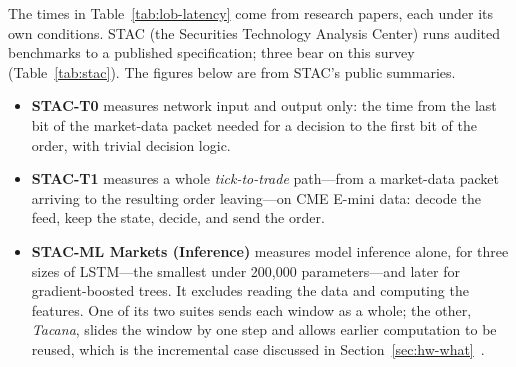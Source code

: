 The times in Table~\ref{tab:lob-latency} come from research papers, each under its own conditions. STAC (the
Securities Technology Analysis Center) runs audited benchmarks to a published specification; three bear on this
survey (Table~\ref{tab:stac}). The figures below are from STAC's public summaries.
\begin{itemize}[leftmargin=1.5em,itemsep=1pt]
\item \textbf{STAC-T0} measures network input and output only: the time from the last bit of the market-data packet
  needed for a decision to the first bit of the order, with trivial decision logic.
\item \textbf{STAC-T1} measures a whole \emph{tick-to-trade} path---from a market-data packet arriving to the
  resulting order leaving---on CME E-mini data: decode the feed, keep the state, decide,
  and send the order.
\item \textbf{STAC-ML Markets (Inference)} measures model inference alone, for three sizes of LSTM---the smallest
  under 200,000 parameters---and later for gradient-boosted trees. It excludes reading the
  data and computing the features. One of its two suites sends each window as a whole; the other, \emph{Tacana},
  slides the window by one step and allows earlier computation to be reused, which is the incremental case discussed
  in Section~\ref{sec:hw-what}~\citep{stac_ml_wg,stac_ml_limits2025}.
\end{itemize}

